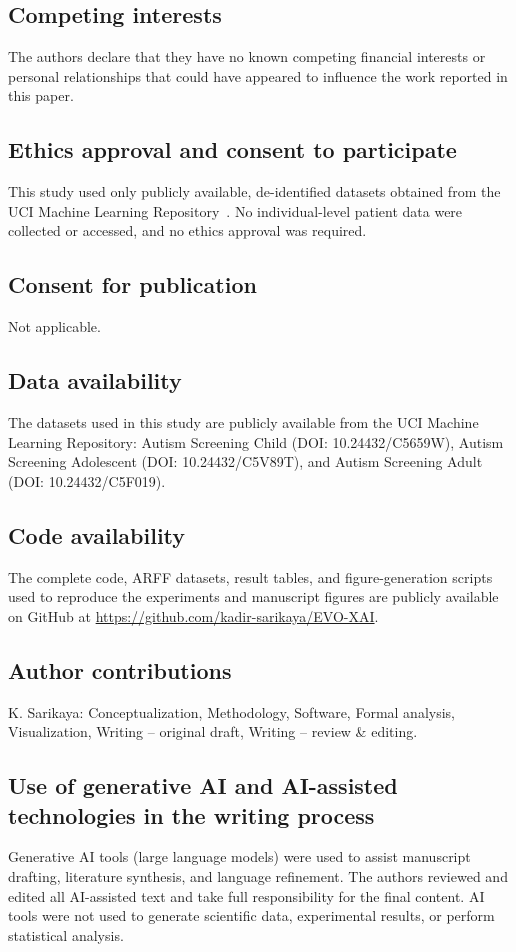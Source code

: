 \documentclass[pdflatex,sn-vancouver-num]{sn-jnl}
\begin{document}
\subsection*{Competing interests}
The authors declare that they have no known competing financial interests or personal relationships that could have appeared to influence the work reported in this paper.

\subsection*{Ethics approval and consent to participate}
This study used only publicly available, de-identified datasets obtained from the UCI Machine Learning Repository~\cite{ref47,ref48,ref49}. No individual-level patient data were collected or accessed, and no ethics approval was required.

\subsection*{Consent for publication}
Not applicable.

\subsection*{Data availability}
The datasets used in this study are publicly available from the UCI Machine Learning Repository: Autism Screening Child (DOI: 10.24432/C5659W), Autism Screening Adolescent (DOI: 10.24432/C5V89T), and Autism Screening Adult (DOI: 10.24432/C5F019).

\subsection*{Code availability}
The complete code, ARFF datasets, result tables, and figure-generation scripts used to reproduce the experiments and manuscript figures are publicly available on GitHub at \url{https://github.com/kadir-sarikaya/EVO-XAI}.

\subsection*{Author contributions}
K. Sarikaya: Conceptualization, Methodology, Software, Formal analysis, Visualization, Writing -- original draft, Writing -- review \& editing.

\subsection*{Use of generative AI and AI-assisted technologies in the writing process}
Generative AI tools (large language models) were used to assist manuscript drafting, literature synthesis, and language refinement. The authors reviewed and edited all AI-assisted text and take full responsibility for the final content. AI tools were not used to generate scientific data, experimental results, or perform statistical analysis.
\end{document}
